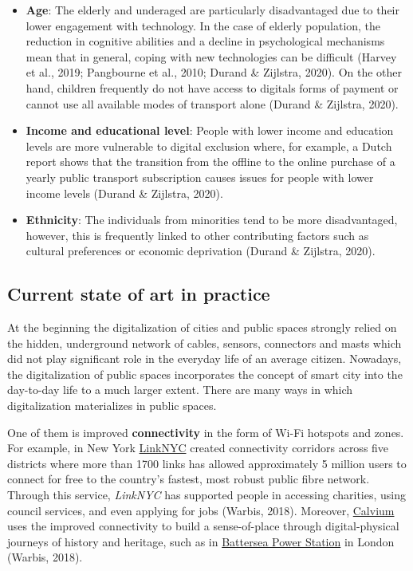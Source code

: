 \documentclass[
]{book}
\providecommand{\tightlist}{%
  \setlength{\itemsep}{0pt}\setlength{\parskip}{0pt}}
\begin{document}
\begin{itemize}
\tightlist
\item
  \textbf{Age}: The elderly and underaged are particularly disadvantaged due to their lower engagement with technology. In the case of elderly population, the reduction in cognitive abilities and a decline in psychological mechanisms mean that in general, coping with new technologies can be difficult (Harvey et al., 2019; Pangbourne et al., 2010; Durand \& Zijlstra, 2020). On the other hand, children frequently do not have access to digitals forms of payment or cannot use all available modes of transport alone (Durand \& Zijlstra, 2020).
\item
  \textbf{Income and educational level}: People with lower income and education levels are more vulnerable to digital exclusion where, for example, a Dutch report shows that the transition from the offline to the online purchase of a yearly public transport subscription causes issues for people with lower income levels (Durand \& Zijlstra, 2020).
\item
  \textbf{Ethnicity}: The individuals from minorities tend to be more disadvantaged, however, this is frequently linked to other contributing factors such as cultural preferences or economic deprivation (Durand \& Zijlstra, 2020).
\end{itemize}

\hypertarget{current-state-of-art-in-practice-5}{%
\subsection*{Current state of art in practice}\label{current-state-of-art-in-practice-5}}

At the beginning the digitalization of cities and public spaces strongly relied on the hidden, underground network of cables, sensors, connectors and masts which did not play significant role in the everyday life of an average citizen. Nowadays, the digitalization of public spaces incorporates the concept of smart city into the day-to-day life to a much larger extent. There are many ways in which digitalization materializes in public spaces.

One of them is improved \textbf{connectivity} in the form of Wi-Fi hotspots and zones. For example, in New York \href{https://www.link.nyc/}{LinkNYC} created connectivity corridors across five districts where more than 1700 links has allowed approximately 5 million users to connect for free to the country's fastest, most robust public fibre network. Through this service, \emph{LinkNYC} has supported people in accessing charities, using council services, and even applying for jobs (Warbis, 2018). Moreover, \href{https://calvium.com/}{Calvium} uses the improved connectivity to build a sense-of-place through digital-physical journeys of history and heritage, such as in \href{https://calvium.com/projects/battersea-power-station-redevelopment/}{Battersea Power Station} in London (Warbis, 2018).
\end{document}
